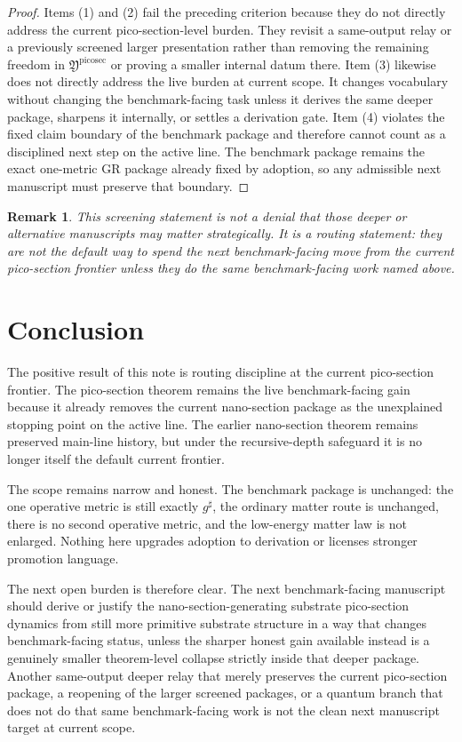 \documentclass[11pt]{article}
\newcommand{\CompletedMetric}{g^{\sharp}}
\newcommand{\PicoSectionPackage}{\mathfrak Y^{\mathrm{picosec}}}
\newtheorem{remark}{Remark}
\begin{document}
\begin{proof}
Items (1) and (2) fail the preceding criterion because they do not directly address the current pico-section-level burden. They revisit a same-output relay or a previously screened larger presentation rather than removing the remaining freedom in \(\PicoSectionPackage\) or proving a smaller internal datum there. Item (3) likewise does not directly address the live burden at current scope. It changes vocabulary without changing the benchmark-facing task unless it derives the same deeper package, sharpens it internally, or settles a derivation gate. Item (4) violates the fixed claim boundary of the benchmark package and therefore cannot count as a disciplined next step on the active line. The benchmark package remains the exact one-metric GR package already fixed by adoption, so any admissible next manuscript must preserve that boundary.
\end{proof}

\begin{remark}
This screening statement is not a denial that those deeper or alternative manuscripts may matter strategically. It is a routing statement: they are not the default way to spend the next benchmark-facing move from the current pico-section frontier unless they do the same benchmark-facing work named above.
\end{remark}

\section{Conclusion}

The positive result of this note is routing discipline at the current pico-section frontier. The pico-section theorem remains the live benchmark-facing gain because it already removes the current nano-section package as the unexplained stopping point on the active line. The earlier nano-section theorem remains preserved main-line history, but under the recursive-depth safeguard it is no longer itself the default current frontier.

The scope remains narrow and honest. The benchmark package is unchanged: the one operative metric is still exactly \(\CompletedMetric\), the ordinary matter route is unchanged, there is no second operative metric, and the low-energy matter law is not enlarged. Nothing here upgrades adoption to derivation or licenses stronger promotion language.

The next open burden is therefore clear. The next benchmark-facing manuscript should derive or justify the nano-section-generating substrate pico-section dynamics from still more primitive substrate structure in a way that changes benchmark-facing status, unless the sharper honest gain available instead is a genuinely smaller theorem-level collapse strictly inside that deeper package. Another same-output deeper relay that merely preserves the current pico-section package, a reopening of the larger screened packages, or a quantum branch that does not do that same benchmark-facing work is not the clean next manuscript target at current scope.
\end{document}
